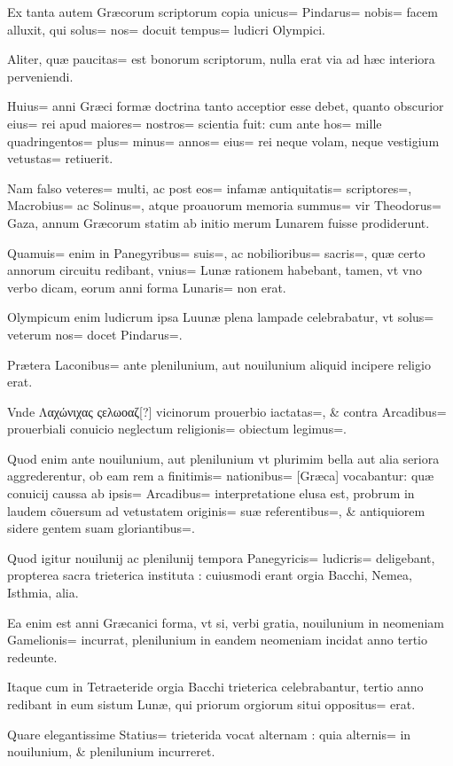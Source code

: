 \begin{parnumbers}
Ex tanta autem Græcorum scriptorum copia unicus= Pindarus= nobis= facem alluxit, qui solus= nos= docuit tempus= ludicri Olympici.

Aliter, quæ paucitas= est bonorum scriptorum, nulla erat via ad hæc interiora perveniendi.

Huius= anni Græci formæ doctrina tanto acceptior esse debet, quanto obscurior eius= rei apud maiores= nostros= scientia fuit: cum ante hos= mille quadringentos= plus= minus= annos= eius= rei neque volam, neque vestigium vetustas= retiuerit.

Nam falso veteres= multi, ac post eos= infamæ 
antiquitatis= scriptores=, Macrobius= ac Solinus=, atque proauorum memoria summus= vir Theodorus= Gaza, annum Græcorum statim ab initio merum Lunarem fuisse prodiderunt.

Quamuis= enim in Panegyribus= suis=, ac nobilioribus= sacris=, quæ certo annorum circuitu redibant, vnius= Lunæ rationem habebant, tamen, vt vno verbo dicam, eorum anni forma Lunaris= non erat.

Olympicum enim ludicrum ipsa Luunæ plena lampade celebrabatur, vt solus= veterum nos= docet Pindarus=. 

Prætera Laconibus= ante plenilunium, aut nouilunium aliquid incipere religio erat.

Vnde Λαχώνιχας ςελωοαζ[?] vicinorum prouerbio iactatas=, \& contra Arcadibus= prouerbiali conuicio neglectum religionis= obiectum legimus=. 

Quod enim ante nouilunium, aut plenilunium vt plurimim bella aut alia seriora aggrederentur, ob eam rem a finitimis= nationibus= [Græca] vocabantur: quæ conuicij caussa ab ipsis= Arcadibus= interpretatione elusa est, probrum in laudem cõuersum ad vetustatem originis= suæ referentibus=, \& antiquiorem sidere gentem suam gloriantibus=. 

Quod igitur nouilunij ac plenilunij tempora Panegyricis= ludicris= deligebant, propterea sacra trieterica instituta : cuiusmodi erant orgia Bacchi, Nemea, Isthmia, alia.

Ea enim est anni Græcanici forma, vt si, verbi gratia, nouilunium in neomeniam Gamelionis= incurrat, plenilunium in eandem neomeniam incidat anno tertio redeunte.

Itaque cum in Tetraeteride orgia Bacchi trieterica celebrabantur, tertio anno redibant in eum sistum Lunæ, qui priorum orgiorum situi oppositus= erat.

Quare elegantissime Statius= trieterida vocat alternam : quia alternis= in nouilunium, \& plenilunium incurreret.


\end{parnumbers}
